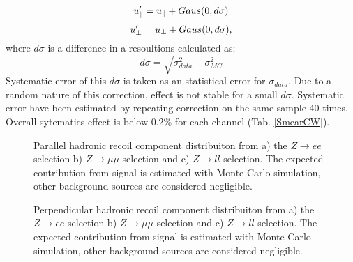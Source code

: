 \begin{equation}
u_{\parallel}' = u_{\parallel}+Gaus(0, d\sigma)
\end{equation}
\begin{equation}
u_{\perp}' = u_{\perp} + Gaus(0, d\sigma),
\end{equation}
where $d\sigma$ is a difference in a resoultions calculated as:
\begin{equation}
d\sigma=\sqrt{\sigma_{data}^2-\sigma_{MC}^2}
\end{equation}
Systematic error of this $d\sigma$ is taken as an statistical error for $\sigma_{data}$. Due to a random nature of this correction, effect is not stable for a small $d\sigma$. Systematic error have been estimated by repeating correction on the same sample 40 times. Overall sytematics effect is below 0.2\% for each channel (Tab. \ref{SmearCW}).
\begin{figure}[!tbp]
\begin{minipage}[h]{0.32\linewidth}
\end{minipage}
\hfill
\begin{minipage}[h]{0.32\linewidth}
\end{minipage}
\hfill
\begin{minipage}[h]{0.32\linewidth}
\end{minipage}
\caption{Parallel hadronic recoil component distribuiton from a) the $Z\to ee$ selection b) $Z\to\mu\mu$ selection and c) $Z\to ll$ selection. The expected contribution from signal is estimated with Monte Carlo simulation, other background sources are considered negligible.}
\label{HadrRecoil:UparSmear}
\end{figure}

\begin{figure}[!tbp]
\begin{minipage}[h]{0.32\linewidth}
\end{minipage}
\hfill
\begin{minipage}[h]{0.32\linewidth}
\end{minipage}
\hfill
\begin{minipage}[h]{0.32\linewidth}
\end{minipage}
\caption{Perpendicular hadronic recoil component distribuiton from a) the $Z\to ee$ selection b) $Z\to\mu\mu$ selection and c) $Z\to ll$ selection. The expected contribution from signal is estimated with Monte Carlo simulation, other background sources are considered negligible.}
\label{HadrRecoil:UpeprSmear}
\end{figure}


